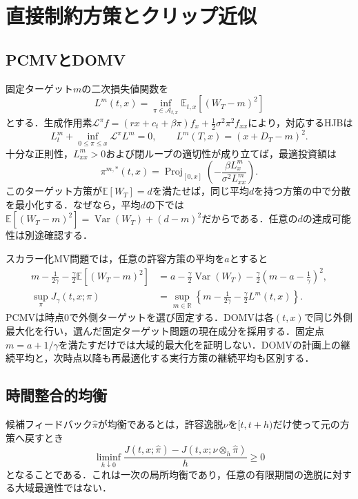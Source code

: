 \documentclass[11pt,a4paper]{article}
\numberwithin{equation}{section}
\numberwithin{table}{section}
\numberwithin{figure}{section}
\theoremstyle{plain}
\theoremstyle{definition}
\newcommand{\E}{\mathbb{E}}
\DeclareMathOperator{\Var}{Var}
\DeclareMathOperator{\Proj}{Proj}
\begin{document}
\FloatBarrier
\section{直接制約方策とクリップ近似}
\label{sec:theory}
\subsection{PCMVとDOMV}
固定ターゲット$m$の二次損失値関数を
\begin{equation}
L^m(t,x)=\inf_{\pi\in\mathcal A_{t,x}}\E_{t,x}[(W_T-m)^2]
\label{eq:loss}
\end{equation}
とする．生成作用素$\mathcal L^\pi f=(rx+c_t+\beta\pi)f_x+\tfrac12\sigma^2\pi^2f_{xx}$により，対応するHJBは
\begin{equation}
L_t^m+\inf_{0\leq\pi\leq x}\mathcal L^\pi L^m=0,
\qquad L^m(T,x)=(x+D_T-m)^2.
\label{eq:hjb}
\end{equation}
十分な正則性，$L_{xx}^m>0$および閉ループの適切性が成り立てば，最適投資額は
\begin{equation}
\pi^{m,*}(t,x)=\Proj_{[0,x]}\left(-\frac{\beta L_x^m}{\sigma^2L_{xx}^m}\right).
\label{eq:pcproj}
\end{equation}
このターゲット方策が$\E[W_T]=d$を満たせば，同じ平均$d$を持つ方策の中で分散を最小化する．なぜなら，平均$d$の下では$\E[(W_T-m)^2]=\Var(W_T)+(d-m)^2$だからである．任意の$d$の達成可能性は別途確認する．

スカラー化MV問題では，任意の許容方策の平均を$a$とすると
\begin{align}
m-\frac1{2\gamma}-\frac\gamma2\E[(W_T-m)^2]
&=a-\frac\gamma2\Var(W_T)-\frac\gamma2\left(m-a-\frac1\gamma\right)^2,\label{eq:envelope-id}\\
\sup_\pi J_\gamma(t,x;\pi)
&=\sup_{m\in\mathbb R}\left\{m-\frac1{2\gamma}-\frac\gamma2L^m(t,x)\right\}.
\label{eq:envelope}
\end{align}
PCMVは時点0で外側ターゲットを選び固定する．DOMVは各$(t,x)$で同じ外側最大化を行い，選んだ固定ターゲット問題の現在成分を採用する．固定点$m=a+1/\gamma$を満たすだけでは大域的最大化を証明しない．DOMVの計画上の継続平均と，次時点以降も再最適化する実行方策の継続平均も区別する．

\subsection{時間整合的均衡}
候補フィードバック$\hat\pi$が均衡であるとは，許容逸脱$\nu$を$[t,t+h)$だけ使って元の方策へ戻すとき
\begin{equation}
\liminf_{h\downarrow0}\frac{J(t,x;\hat\pi)-J(t,x;\nu\otimes_h\hat\pi)}h\geq0
\label{eq:eqdef}
\end{equation}
となることである．これは一次の局所均衡であり，任意の有限期間の逸脱に対する大域最適性ではない．
\end{document}
